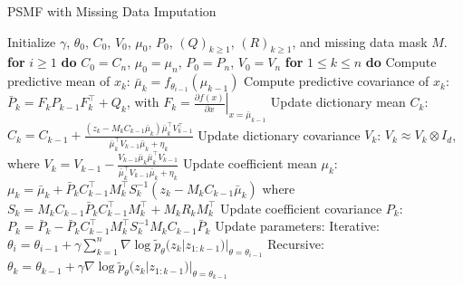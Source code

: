 \documentclass{mldsmsc}
\begin{document}
\begin{algorithm}[H]
\caption{PSMF with Missing Data Imputation}
\begin{algorithmic}[1]
\State Initialize $\gamma$, $\theta_0$, $C_0$, $V_0$, $\mu_0$, $P_0$, $(Q)_{k \geq 1}$, $(R)_{k \geq 1}$, and missing data mask $M$.
\State \textbf{for} $i \geq 1$ \textbf{do}
\State \hspace{1em} $C_0 = C_n$, $\mu_0 = \mu_n$, $P_0 = P_n$, $V_0 = V_n$
\State \hspace{1em} \textbf{for} $1 \leq k \leq n$ \textbf{do}
\State \hspace{2em} Compute predictive mean of $x_k$:
\State \hspace{3em} $\bar{\mu}_k = f_{\theta_{i-1}}(\mu_{k-1})$
\State \hspace{2em} Compute predictive covariance of $x_k$:
\State \hspace{3em} $\bar{P}_k = F_k P_{k-1} F_k^\top + Q_k$, with $F_k = \left. \frac{\partial f(x)}{\partial x} \right|_{x=\bar{\mu}_{k-1}}$
\State \hspace{2em} Update dictionary mean $C_k$:
\State \hspace{3em} $C_k = C_{k-1} + \frac{(z_k - M_k C_{k-1} \bar{\mu}_k)\bar{\mu}_k^\top V_{k-1}^\top}{\bar{\mu}_k^\top V_{k-1} \bar{\mu}_k + \eta_k}$
\State \hspace{2em} Update dictionary covariance $V_k$:
\State \hspace{3em} $V_k \approx V_k \otimes I_d$, where
\State \hspace{3em} $V_k = V_{k-1} - \frac{V_{k-1} \bar{\mu}_k \bar{\mu}_k^\top V_{k-1}}{\bar{\mu}_k^\top V_{k-1} \bar{\mu}_k + \eta_k}$
\State \hspace{2em} Update coefficient mean $\mu_k$:
\State \hspace{3em} $\mu_k = \bar{\mu}_k + \bar{P}_k C_{k-1}^\top M_k^\top S_k^{-1} (z_k - M_k C_{k-1} \bar{\mu}_k)$
\State \hspace{3em} where $S_k = M_k C_{k-1} \bar{P}_k C_{k-1}^\top M_k^\top + M_k R_k M_k^\top$
\State \hspace{2em} Update coefficient covariance $P_k$:
\State \hspace{3em} $P_k = \bar{P}_k - \bar{P}_k C_{k-1}^\top M_k^\top S_k^{-1} M_k C_{k-1} \bar{P}_k$
\State \hspace{1em} Update parameters:
\State \hspace{2em} Iterative: $\theta_i = \theta_{i-1} + \gamma \sum_{k=1}^n \nabla \log \tilde{p}_\theta(z_k | z_{1:k-1}) |_{\theta=\theta_{i-1}}$
\State \hspace{2em} Recursive: $\theta_k = \theta_{k-1} + \gamma \nabla \log \tilde{p}_\theta(z_k | z_{1:k-1}) |_{\theta=\theta_{k-1}}$
\end{algorithmic}\label{algo:psmf_missing_data}
\end{algorithm}
\end{document}
